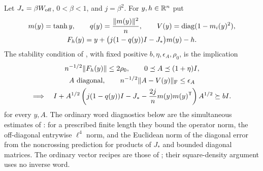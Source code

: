 Let \(J_*=\beta W_{\rm off}\), \(0<\beta<1\), and \(j=\beta^2\).
For \(y,h\in\mathbb R^n\) put
\[
\begin{gathered}
 m(y)=\tanh y,\qquad q(y)=\frac{\|m(y)\|^2}{n},\qquad
 V(y)=\operatorname{diag}(1-m_i(y)^2),\\
 F_h(y)=y+\bigl(j(1-q(y))I-J_*\bigr)m(y)-h .
\end{gathered}
\]
The stability condition of \cite[Equation~(17.2)]{CM}, with fixed
positive \(b,\eta,\epsilon_A,\rho_0\), is the implication
\begin{equation}
\begin{gathered}
 n^{-1/2}\|F_h(y)\|\le2\rho_0,\qquad 0\preceq A\preceq(1+\eta)I,\\
 A\ \hbox{diagonal},\qquad
 n^{-1/2}\|A-V(y)\|_{\rm F}\le\epsilon_A\\
\Longrightarrow\quad
 I+A^{1/2}\left(j(1-q(y))I-J_*
       -\frac{2j}{n}m(y)m(y)^{\mathsf T}\right)A^{1/2}\succeq bI .
\end{gathered}
                                                               \label{warm:stability}
\end{equation}
for every \(y,A\).  The ordinary word diagnostics below are the
simultaneous estimates of \cite[Lemma~3.1]{SG}: for a prescribed
finite length they bound the operator norm, the off-diagonal entrywise
\(\ell^4\) norm, and the Euclidean norm of the diagonal error from
the noncrossing prediction for products of \(J_*\) and bounded
diagonal matrices.  The ordinary vector recipes are those of
\cite[Definition~6.2]{SG}; their square-density argument uses no
inverse word.

